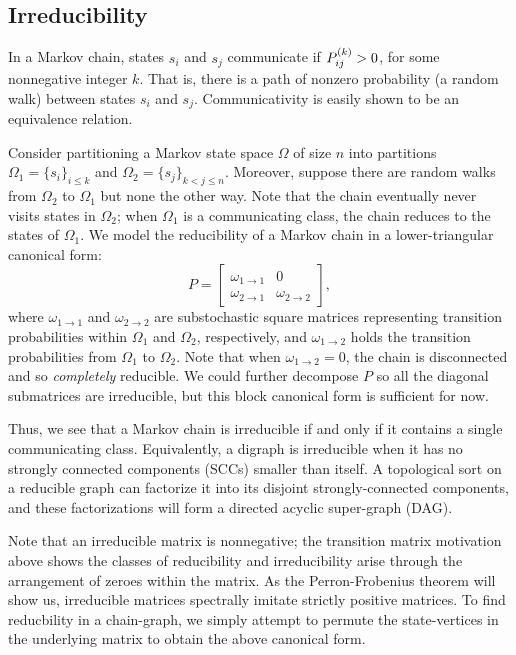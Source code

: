 \documentclass[../exploring-pagerank.tex]{subfiles}
\begin{document}
	\subsection{Irreducibility}
	In a Markov chain, states $s_i$ and $s_j$ communicate if $P^{(k)}_{ij} > 0$, for some nonnegative integer $k$. That is, there is a path of nonzero probability (a random walk) between states $s_i$ and $s_j$. Communicativity is easily shown to be an equivalence relation. 
	
	Consider partitioning a Markov state space $\Omega$ of size $n$ into partitions $\Omega_1 = \{ s_i \}_{i\leq k}$ and $\Omega_2 = \{ s_j \}_{k < j \leq n}$. Moreover, suppose there are random walks from $\Omega_2$ to $\Omega_1$ but none the other way. Note that the chain eventually never visits states in $\Omega_2$; when $\Omega_1$ is a communicating class, the chain reduces to the states of $\Omega_1$. We model the reducibility of a Markov chain in a lower-triangular canonical form:
	\begin{equation*}
	    \label{eqn:reducible}
	    P = 
	    \begin{bmatrix}
	        \omega_{1\to 1} & 0 \\
	         \omega_{2 \to 1} & \omega_{2 \to 2}
	    \end{bmatrix},
	\end{equation*}
	where $\omega_{1\to 1}$ and $\omega_{2\to 2}$ are substochastic square matrices representing transition probabilities within $\Omega_1$ and $\Omega_2$, respectively, and $\omega_{1 \to 2}$ holds the transition probabilities from $\Omega_1$ to $\Omega_2$. Note that when $\omega_{1\to 2} = 0$, the chain is disconnected and so \textit{completely} reducible. We could further decompose $P$ so all the diagonal submatrices are irreducible, but this block canonical form is sufficient for now.
	
	Thus, we see that a Markov chain is irreducible if and only if it contains a single communicating class. Equivalently, a digraph is irreducible when it has no strongly connected components (SCCs) smaller than itself. A topological sort on a reducible graph can factorize it into its disjoint strongly-connected components, and these factorizations will form a directed acyclic super-graph (DAG).
	
	Note that an irreducible matrix is nonnegative; the transition matrix motivation above shows the classes of reducibility and irreducibility arise through the arrangement of zeroes within the matrix. As the Perron-Frobenius theorem will show us, irreducible matrices spectrally imitate strictly positive matrices. To find reducbility in a chain-graph, we simply attempt to permute the state-vertices in the underlying matrix to obtain the above canonical form.
\end{document}
